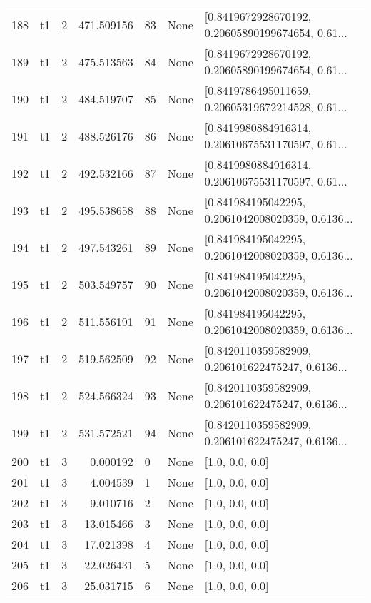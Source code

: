 \begin{tabular}{lllrlll}
188 &  t1 &   2 &  471.509156 &   83 &  None &  [0.8419672928670192, 0.20605890199674654, 0.61... \\
189 &  t1 &   2 &  475.513563 &   84 &  None &  [0.8419672928670192, 0.20605890199674654, 0.61... \\
190 &  t1 &   2 &  484.519707 &   85 &  None &  [0.8419786495011659, 0.20605319672214528, 0.61... \\
191 &  t1 &   2 &  488.526176 &   86 &  None &  [0.8419980884916314, 0.20610675531170597, 0.61... \\
192 &  t1 &   2 &  492.532166 &   87 &  None &  [0.8419980884916314, 0.20610675531170597, 0.61... \\
193 &  t1 &   2 &  495.538658 &   88 &  None &  [0.841984195042295, 0.2061042008020359, 0.6136... \\
194 &  t1 &   2 &  497.543261 &   89 &  None &  [0.841984195042295, 0.2061042008020359, 0.6136... \\
195 &  t1 &   2 &  503.549757 &   90 &  None &  [0.841984195042295, 0.2061042008020359, 0.6136... \\
196 &  t1 &   2 &  511.556191 &   91 &  None &  [0.841984195042295, 0.2061042008020359, 0.6136... \\
197 &  t1 &   2 &  519.562509 &   92 &  None &  [0.8420110359582909, 0.206101622475247, 0.6136... \\
198 &  t1 &   2 &  524.566324 &   93 &  None &  [0.8420110359582909, 0.206101622475247, 0.6136... \\
199 &  t1 &   2 &  531.572521 &   94 &  None &  [0.8420110359582909, 0.206101622475247, 0.6136... \\
200 &  t1 &   3 &    0.000192 &    0 &  None &                                    [1.0, 0.0, 0.0] \\
201 &  t1 &   3 &    4.004539 &    1 &  None &                                    [1.0, 0.0, 0.0] \\
202 &  t1 &   3 &    9.010716 &    2 &  None &                                    [1.0, 0.0, 0.0] \\
203 &  t1 &   3 &   13.015466 &    3 &  None &                                    [1.0, 0.0, 0.0] \\
204 &  t1 &   3 &   17.021398 &    4 &  None &                                    [1.0, 0.0, 0.0] \\
205 &  t1 &   3 &   22.026431 &    5 &  None &                                    [1.0, 0.0, 0.0] \\
206 &  t1 &   3 &   25.031715 &    6 &  None &                                    [1.0, 0.0, 0.0] \\

\end{tabular}
